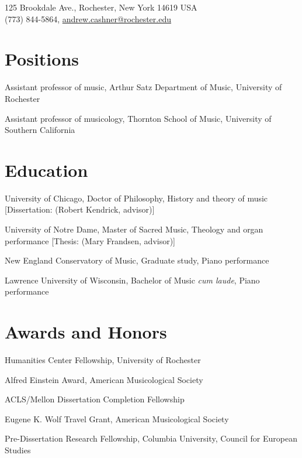 \documentclass[11pt]{article}
\begin{document}

\begin{cvAddress}
125 Brookdale Ave., Rochester, New York 14619 USA \\
(773) 844-5864, \url{andrew.cashner@rochester.edu}
\end{cvAddress}

\section{Positions}
{Assistant professor of music,
Arthur Satz Department of Music, University of Rochester}

{Assistant professor of musicology,
Thornton School of Music, University of Southern California}

\section{Education}
{University of Chicago,
Doctor of Philosophy, History and theory of music}
[Dissertation:  (Robert Kendrick, advisor)]

{University of Notre Dame,
Master of Sacred Music, Theology and organ performance}
[Thesis:  (Mary Frandsen, advisor)]

{New England Conservatory of Music,
Graduate study, Piano performance}

{Lawrence University of Wisconsin,
Bachelor of Music \emph{cum laude}, Piano performance}

\section{Awards and Honors}
{Humanities Center Fellowship, University of Rochester}

{Alfred Einstein Award, American Musicological Society}

{ACLS/Mellon Dissertation Completion Fellowship}

{Eugene K. Wolf Travel Grant, American Musicological Society}

{Pre-Dissertation Research Fellowship, Columbia University, Council for
European Studies}
\end{document}
